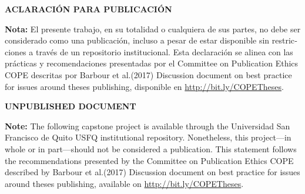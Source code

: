 \begin{titlepage}
\begin{spanish}
\begin{center}
    {\LARGE\textbf{ACLARACIÓN PARA PUBLICACIÓN}}
\end{center}

\noindent\textbf{Nota:} El presente trabajo, en su totalidad o
cualquiera de sus partes, no debe ser considerado como una
publicación, incluso a pesar de estar disponible sin
restricciones a través de un  repositorio institucional. Esta
declaración se alinea con las prácticas y recomendaciones
presentadas por el Committee on Publication Ethics COPE descritas
por Barbour et al.\@ (2017) Discussion document on best practice
for issues around theses publishing, disponible en
\url{http://bit.ly/COPETheses}.
\end{spanish}

\bigskip

\begin{center}
    {\LARGE\textbf{UNPUBLISHED DOCUMENT}}
\end{center}

\noindent\textbf{Note:} The following capstone project is
available through the Universidad San Francisco de Quito USFQ
institutional repository. Nonetheless, this project---in whole or
in part---should not be considered a publication. This statement
follows the recommendations presented by the Committee on
Publication Ethics COPE described by Barbour et al.\@ (2017)
Discussion document on best practice for issues around theses
publishing, available on \url{http://bit.ly/COPETheses}.

\end{titlepage}
